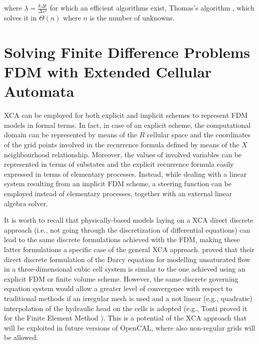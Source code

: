   where $\lambda = \frac{k\Delta t}{\Delta x^2}$ for which an efficient algorithms exist, Thomas's algorithm \cite{Datta:2010,Higham:2002}, which solves it in ${\Theta}(n)$ where $n$ is the number of unknowns.
 


        
\section[Solving FDM with XCA]{Solving Finite Difference Problems FDM with Extended Cellular Automata}
    XCA can be employed for both explicit and implicit schemes to
    represent FDM models in formal terms. In fact, in case of an
    explicit scheme, the computational domain can be represented by
    means of the $R$ cellular space and the coordinates of the grid
    points involved in the recurrence formula defined by means of the
    $X$ neighbourhood relationship. Moreover, the values of involved
    variables can be represented in terms of substates and the
    explicit recurrence formula easily expressed in terms of
    elementary processes. Instead, while dealing with a linear system
    resulting from an implicit FDM scheme, a steering function can be
    employed instead of elementary processes, together with an
    external linear algebra solver.

    It is worth to recall that physically-based models laying on a XCA
    direct discrete approach (i.e., not going through the
    discretization of differential equations) can lead to the same
    discrete formulations achieved with the FDM, making these latter
    formulations a specific case of the general XCA
    approach. \cite{Mendicino:2006} proved that
    their direct discrete formulation of the Darcy equation for
    modelling unsaturated flow in a three-dimensional cubic cell
    system is similar to the one achieved using an explicit FDM or
    finite volume scheme. However, the same discrete governing
    equation system would allow a greater level of convergence with
    respect to traditional methods if an irregular mesh is used
    and a not linear (e.g., quadratic) interpolation of the hydraulic
    head on the cells is adopted (e.g., Tonti proved it for the Finite
    Element Method \cite{Tonti2001237}). This is a potential of the XCA
    approach that will be exploited in future versions of OpenCAL,
    where also non-regular grids will be allowed.






